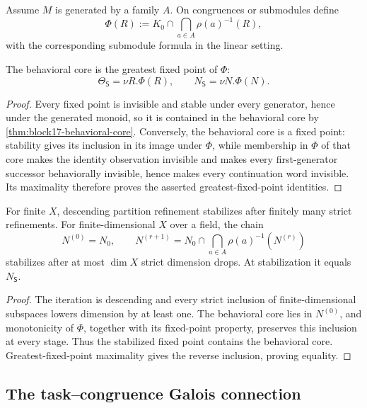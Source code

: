 Assume \(M\) is generated by a family \(A\).  On congruences or submodules define
\[
 \Phi(R)
 :=
 K_0\cap\bigcap_{a\in A}\rho(a)^{-1}(R),
\]
with the corresponding submodule formula in the linear setting.

\begin{theorem}
\label{thm:block17-coinductive-characterization}
The behavioral core is the greatest fixed point of \(\Phi\):
\[
 \Theta_{\mathsf S}=\nu R.\Phi(R),
 \qquad
 N_{\mathsf S}=\nu N.\Phi(N).
\]
\end{theorem}

\begin{proof}
Every fixed point is invisible and stable under every generator, hence under
the generated monoid, so it is contained in the behavioral core by
\cref{thm:block17-behavioral-core}.  Conversely, the behavioral core is a fixed
point: stability gives its inclusion in its image under \(\Phi\), while
membership in \(\Phi\) of that core makes the identity observation invisible
and makes every first-generator successor behaviorally invisible, hence makes
every continuation word invisible.  Its maximality therefore proves the
asserted greatest-fixed-point identities.
\end{proof}

\begin{corollary}
\label{cor:block17-finite-certification}
For finite \(X\), descending partition refinement stabilizes after finitely many strict refinements.  For finite-dimensional \(X\) over a field, the chain
\[
 N^{(0)}=N_0,
 \qquad
 N^{(r+1)}=
 N_0\cap\bigcap_{a\in A}\rho(a)^{-1}(N^{(r)})
\]
stabilizes after at most \(\dim X\) strict dimension drops.  At stabilization it equals \(N_{\mathsf S}\).
\end{corollary}

\begin{proof}
The iteration is descending and every strict inclusion of finite-dimensional subspaces lowers dimension by at least one.  The behavioral core lies in \(N^{(0)}\), and monotonicity of \(\Phi\), together
with its fixed-point property, preserves this inclusion at every stage.  Thus
the stabilized fixed point contains the behavioral core.  Greatest-fixed-point
maximality gives the reverse inclusion, proving equality.
\end{proof}

\subsection{The task--congruence Galois connection}
\label{subsec:block17-task-galois}

